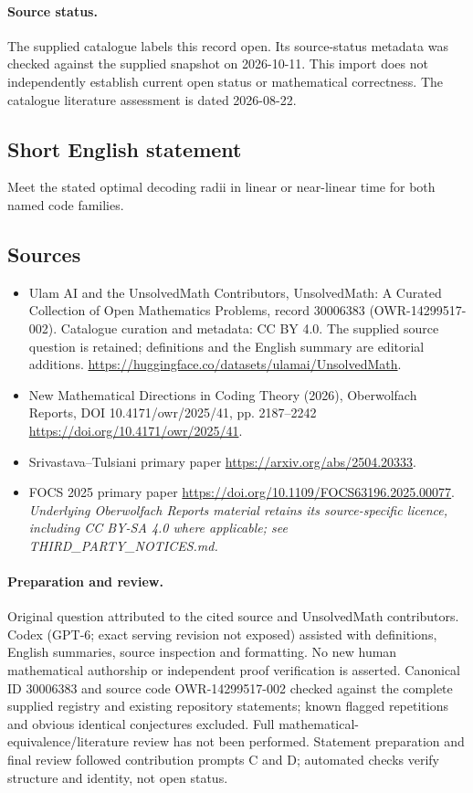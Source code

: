 \documentclass[11pt]{article}
\begin{document}
\paragraph{Source status.}
The supplied catalogue labels this record open. Its source-status metadata was checked against the supplied snapshot on 2026-10-11. This import does not independently establish current open status or mathematical correctness. The catalogue literature assessment is dated 2026-08-22.
\subsection{Short English statement}
Meet the stated optimal decoding radii in linear or near-linear time for both named code families.
\subsection{Sources}
\begin{itemize}
\item[\hypertarget{source:30006383:1}{S1}] Ulam AI and the UnsolvedMath Contributors, UnsolvedMath: A Curated Collection of Open Mathematics Problems, record 30006383 (OWR-14299517-002). Catalogue curation and metadata: CC BY 4.0. The supplied source question is retained; definitions and the English summary are editorial additions.
\url{https://huggingface.co/datasets/ulamai/UnsolvedMath}.
\item[\hypertarget{source:30006383:2}{S2}] New Mathematical Directions in Coding Theory (2026), Oberwolfach Reports, DOI 10.4171/owr/2025/41, pp. 2187--2242
\url{https://doi.org/10.4171/owr/2025/41}.
\item[\hypertarget{source:30006383:3}{S3}] Srivastava--Tulsiani primary paper
\url{https://arxiv.org/abs/2504.20333}.
\item[\hypertarget{source:30006383:4}{S4}] FOCS 2025 primary paper
\url{https://doi.org/10.1109/FOCS63196.2025.00077}.
\textit{Underlying Oberwolfach Reports material retains its source-specific licence, including CC BY-SA 4.0 where applicable; see THIRD\_PARTY\_NOTICES.md.}
\end{itemize}
\paragraph{Preparation and review.}
Original question attributed to the cited source and UnsolvedMath contributors. Codex (GPT-6; exact serving revision not exposed) assisted with definitions, English summaries, source inspection and formatting. No new human mathematical authorship or independent proof verification is asserted. Canonical ID 30006383 and source code OWR-14299517-002 checked against the complete supplied registry and existing repository statements; known flagged repetitions and obvious identical conjectures excluded. Full mathematical-equivalence/literature review has not been performed. Statement preparation and final review followed contribution prompts C and D; automated checks verify structure and identity, not open status.
\label{end:30006383}
\end{document}
